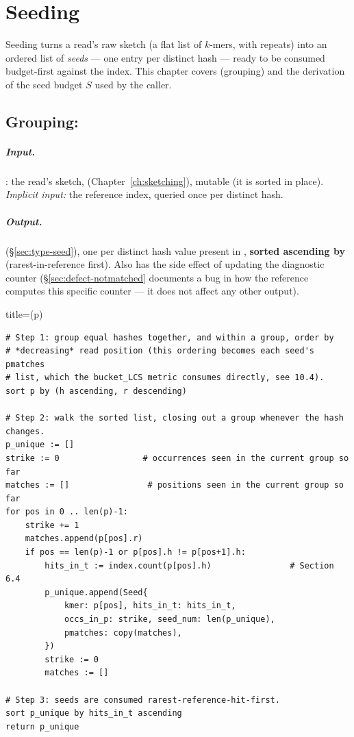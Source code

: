 \chapter{Seeding}
\label{ch:seeding}

Seeding turns a read's raw sketch (a flat list of $k$-mers, with repeats) into an ordered list of
\emph{seeds} --- one entry per distinct hash --- ready to be consumed budget-first against the
index. This chapter covers  (grouping) and the derivation of
the seed budget $S$ used by the caller.

\section{Grouping: }
\label{sec:seeding-grouping}

\paragraph{Input.} : the read's sketch,  (Chapter~\ref{ch:sketching}),
mutable (it is sorted in place). \emph{Implicit input:} the reference index, queried once per
distinct hash.

\paragraph{Output.}  (\S\ref{sec:type-seed}), one per distinct hash value present
in , \textbf{sorted ascending by } (rarest-in-reference first). Also
has the side effect of updating the  diagnostic counter
(\S\ref{sec:defect-notmatched} documents a bug in how the reference computes this specific
counter --- it does not affect any other output).

\begin{algobox}{title={(p)}}
\begin{verbatim}
# Step 1: group equal hashes together, and within a group, order by
# *decreasing* read position (this ordering becomes each seed's pmatches
# list, which the bucket_LCS metric consumes directly, see 10.4).
sort p by (h ascending, r descending)

# Step 2: walk the sorted list, closing out a group whenever the hash changes.
p_unique := []
strike := 0                 # occurrences seen in the current group so far
matches := []                # positions seen in the current group so far
for pos in 0 .. len(p)-1:
    strike += 1
    matches.append(p[pos].r)
    if pos == len(p)-1 or p[pos].h != p[pos+1].h:
        hits_in_t := index.count(p[pos].h)                # Section 6.4
        p_unique.append(Seed{
            kmer: p[pos], hits_in_t: hits_in_t,
            occs_in_p: strike, seed_num: len(p_unique),
            pmatches: copy(matches),
        })
        strike := 0
        matches := []

# Step 3: seeds are consumed rarest-reference-hit-first.
sort p_unique by hits_in_t ascending
return p_unique
\end{verbatim}
\end{algobox}

